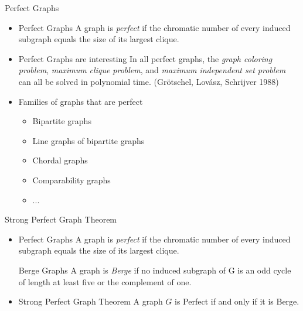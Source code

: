 \documentclass{beamer}
\begin{document}
\begin{frame}{Perfect Graphs}
\begin{itemize}
\item<1->[]\begin{block}{Perfect Graphs}
A graph is \emph{perfect} if the chromatic number of every induced subgraph equals the size of its largest clique.
\end{block}
\item<2->[]\vspace{-0.55cm}\begin{block}{Perfect Graphs are interesting}
In all perfect graphs, the \emph{graph coloring problem}, \emph{maximum clique problem}, and \emph{maximum independent set problem} can all be solved in polynomial time. (Grötschel, Lovász, Schrijver 1988)
\end{block}
\item<3->[]\vspace{-0.55cm}\begin{block}{Families of graphs that are perfect}
\begin{itemize}
\item Bipartite graphs
\vspace{-0.1cm}\item Line graphs of bipartite graphs
\vspace{-0.1cm}\item Chordal graphs
\vspace{-0.1cm}\item Comparability graphs
\vspace{-0.1cm}\item ...
\end{itemize}
\end{block}

\end{itemize}
\end{frame}




\begin{frame}{Strong Perfect Graph Theorem}
\begin{itemize}
\item<1->[]\begin{block}{Perfect Graphs}
A graph is \emph{perfect} if the chromatic number of every induced subgraph equals the size of its largest clique.
\end{block}
\begin{block}{Berge Graphs}
A graph is \emph{Berge} if no induced subgraph of G is an odd cycle of length at least five or the
complement of one.
\end{block}
\item<2->[]\begin{block}{Strong Perfect Graph Theorem}
A graph $G$ is Perfect if and only if it is Berge.
\end{block}
\end{itemize}
\end{frame}
\end{document}
